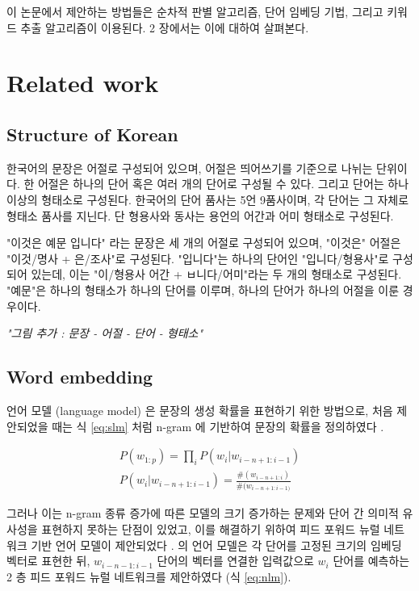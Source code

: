 \documentclass[11pt]{article}
\begin{document}
이 논문에서 제안하는 방법들은 순차적 판별 알고리즘, 단어 임베딩 기법, 그리고 키워드 추출 알고리즘이 이용된다.
2 장에서는 이에 대하여 살펴본다.

\section{Related work}

\subsection{Structure of Korean}

한국어의 문장은 어절로 구성되어 있으며, 어절은 띄어쓰기를 기준으로 나뉘는 단위이다.
한 어절은 하나의 단어 혹은 여러 개의 단어로 구성될 수 있다.
그리고 단어는 하나 이상의 형태소로 구성된다.
한국어의 단어 품사는 5언 9품사이며, 각 단어는 그 자체로 형태소 품사를 지닌다.
단 형용사와 동사는 용언의 어간과 어미 형태소로 구성된다.

"이것은 예문 입니다" 라는 문장은 세 개의 어절로 구성되어 있으며, "이것은" 어절은 "이것/명사 + 은/조사"로 구성된다.
"입니다"는 하나의 단어인 "입니다/형용사"로 구성되어 있는데, 이는 "이/형용사 어간 + ㅂ니다/어미"라는 두 개의 형태소로 구성된다.
"예문"은 하나의 형태소가 하나의 단어를 이루며, 하나의 단어가 하나의 어절을 이룬 경우이다.

\textit{"그림 추가 : 문장 - 어절 - 단어 - 형태소"}

\subsection{Word embedding}

언어 모델 (language model) 은 문장의 생성 확률을 표현하기 위한 방법으로, 처음 제안되었을 때는 식 \ref{eq:slm} 처럼 n-gram 에 기반하여 문장의 확률을 정의하였다 \citep{jurafsky2014speech}.

\begin{equation}
  \label{eq:slm}
  \begin{aligned}
  P(w_{1:p}) = \prod_i P(w_i \vert w_{i-n+1:i-1}) \\
  P(w_i \vert w_{i-n+1:i-1}) = \frac{\#(w_{i-n+1:i})}{\#(w_{i-n+1:i-1)}}
  \end{aligned}
\end{equation}

그러나 이는 n-gram 종류 증가에 따른 모델의 크기 증가하는 문제와 단어 간 의미적 유사성을 표현하지 못하는 단점이 있었고, 이를 해결하기 위하여 피드 포워드 뉴럴 네트워크 기반 언어 모델이 제안되었다 \citep{bengio2003neural}.
\citep{bengio2003neural} 의 언어 모델은 각 단어를 고정된 크기의 임베딩 벡터로 표현한 뒤, $w_{i-n-1:i-1}$ 단어의 벡터를 연결한 입력값으로 $w_i$ 단어를 예측하는 2 층 피드 포워드 뉴럴 네트워크를 제안하였다 (식 \ref{eq:nlm}).
\end{document}
